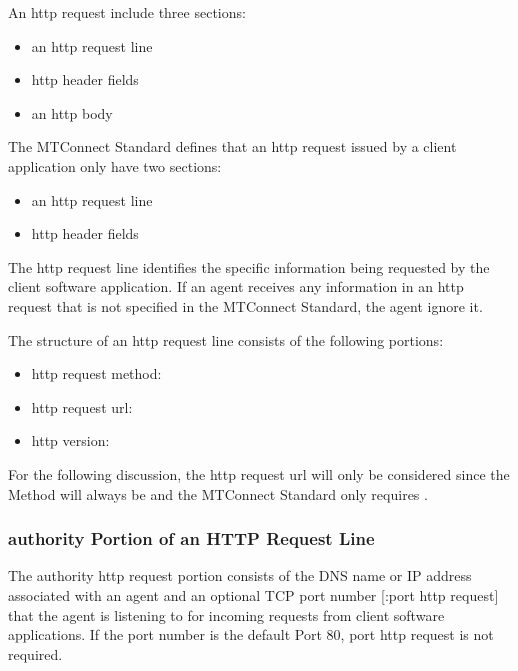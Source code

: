 An \gls{http request} \MAY include three sections:

\begin{itemize}
\item an \gls{http request line}

\item \glspl{http header field}

\item an \gls{http body}
\end{itemize}

The MTConnect Standard defines that an \gls{http request} issued by a client application \SHOULD only have two sections:

\begin{itemize}
\item an \gls{http request line}

\item \glspl{http header field}
\end{itemize}

The \gls{http request line} identifies the specific information being requested by the client software application.  If an \gls{agent} receives any information in an \gls{http request} that is not specified in the MTConnect Standard, the \gls{agent} \MAY ignore it.  

The structure of an \gls{http request line} consists of the following portions:

\begin{itemize}
\item \gls{http request method}: 

\item \gls{http request url}:  

\item \gls{http version}: 
\end{itemize}

For the following discussion, the \gls{http request url} will only be considered since the Method will always be  and the MTConnect Standard only requires .

\subsubsection{authority Portion of an HTTP Request Line}

The \gls{authority http request} portion consists of the DNS name or IP address associated with an \gls{agent} and an optional TCP port number [:\gls{port http request}] that the \gls{agent} is listening to for incoming \glspl{request} from client software applications.  If the port number is the default Port 80, \gls{port http request} is not required.

